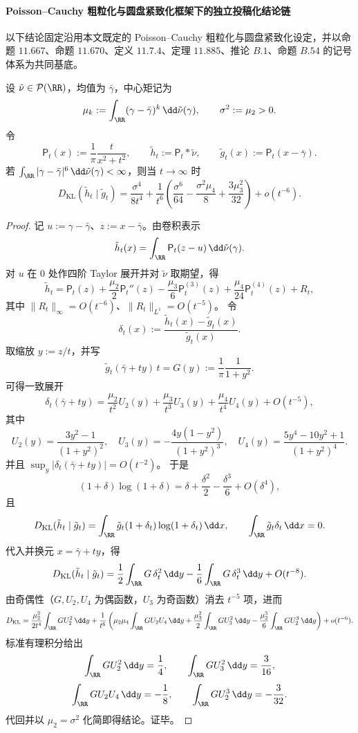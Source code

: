 \paragraph{Poisson--Cauchy 粗粒化与圆盘紧致化框架下的独立投稿化结论链}
以下结论固定沿用本文既定的 Poisson--Cauchy 粗粒化与圆盘紧致化设定，并以命题 \(11.667\)、命题 \(11.670\)、定义 \(11.7.4\)、定理 \(11.885\)、推论 \(B.1\)、命题 \(B.54\) 的记号体系为共同基底。

\begin{conclusion}\label{con:xi-poisson-cauchy-kl-sixth-order-independent-submission}
设 \(\tilde\nu\in\mathcal P(\RR)\)，均值为 \(\bar\gamma\)，中心矩记为
\[
\mu_k:=\int_{\RR}(\gamma-\bar\gamma)^k\,\dd\tilde\nu(\gamma),\qquad
\sigma^2:=\mu_2>0.
\]
令
\[
\mathsf P_t(x):=\frac{1}{\pi}\frac{t}{x^2+t^2},\qquad
\tilde h_t:=\mathsf P_t*\tilde\nu,\qquad
\tilde g_t(x):=\mathsf P_t(x-\bar\gamma).
\]
若 \(\int_{\RR}|\gamma-\bar\gamma|^6\,\dd\tilde\nu(\gamma)<\infty\)，则当 \(t\to\infty\) 时
\[
D_{\mathrm{KL}}(\tilde h_t\mid \tilde g_t)
=\frac{\sigma^4}{8t^4}
+\frac{1}{t^6}\left(
\frac{\sigma^6}{64}
-\frac{\sigma^2\mu_4}{8}
+\frac{3\mu_3^2}{32}
\right)
+o(t^{-6}).
\]
\end{conclusion}
\begin{proof}
记 \(u:=\gamma-\bar\gamma\)、\(z:=x-\bar\gamma\)。由卷积表示
\[
\tilde h_t(x)=\int_{\RR}\mathsf P_t(z-u)\,\dd\tilde\nu(\gamma).
\]
对 \(u\) 在 \(0\) 处作四阶 Taylor 展开并对 \(\tilde\nu\) 取期望，得
\[
\tilde h_t
=\mathsf P_t(z)
+\frac{\mu_2}{2}\mathsf P_t''(z)
-\frac{\mu_3}{6}\mathsf P_t^{(3)}(z)
+\frac{\mu_4}{24}\mathsf P_t^{(4)}(z)
+R_t,
\]
其中 \(\|R_t\|_\infty=O(t^{-6})\)、\(\|R_t\|_{L^1}=O(t^{-5})\)。
令
\[
\delta_t(x):=\frac{\tilde h_t(x)-\tilde g_t(x)}{\tilde g_t(x)}.
\]
取缩放 \(y:=z/t\)，并写
\[
\tilde g_t(\bar\gamma+ty)\,t=G(y):=\frac{1}{\pi}\frac{1}{1+y^2}.
\]
可得一致展开
\[
\delta_t(\bar\gamma+ty)
=\frac{\mu_2}{t^2}U_2(y)+\frac{\mu_3}{t^3}U_3(y)+\frac{\mu_4}{t^4}U_4(y)+O(t^{-5}),
\]
其中
\[
U_2(y)=\frac{3y^2-1}{(1+y^2)^2},\quad
U_3(y)=-\frac{4y(1-y^2)}{(1+y^2)^3},\quad
U_4(y)=\frac{5y^4-10y^2+1}{(1+y^2)^4}.
\]
并且 \(\sup_y|\delta_t(\bar\gamma+ty)|=O(t^{-2})\)。
于是
\[
(1+\delta)\log(1+\delta)=\delta+\frac{\delta^2}{2}-\frac{\delta^3}{6}+O(\delta^4),
\]
且
\[
D_{\mathrm{KL}}(\tilde h_t\mid \tilde g_t)
=\int_{\RR}\tilde g_t(1+\delta_t)\log(1+\delta_t)\,\dd x,\qquad
\int_{\RR}\tilde g_t\delta_t\,\dd x=0.
\]
代入并换元 \(x=\bar\gamma+ty\)，得
\[
D_{\mathrm{KL}}(\tilde h_t\mid \tilde g_t)
=\frac12\int_{\RR}G\,\delta_t^2\,\dd y
-\frac16\int_{\RR}G\,\delta_t^3\,\dd y
+O(t^{-8}).
\]
由奇偶性（\(G,U_2,U_4\) 为偶函数，\(U_3\) 为奇函数）消去 \(t^{-5}\) 项，进而
\[
D_{\mathrm{KL}}
=\frac{\mu_2^2}{2t^4}\int_{\RR}GU_2^2\,\dd y
+\frac{1}{t^6}\left(
\mu_2\mu_4\int_{\RR}GU_2U_4\,\dd y
+\frac{\mu_3^2}{2}\int_{\RR}GU_3^2\,\dd y
-\frac{\mu_2^3}{6}\int_{\RR}GU_2^3\,\dd y
\right)
+o(t^{-6}).
\]
标准有理积分给出
\[
\int_{\RR}GU_2^2\,\dd y=\frac14,\qquad
\int_{\RR}GU_3^2\,\dd y=\frac{3}{16},
\]
\[
\int_{\RR}GU_2U_4\,\dd y=-\frac18,\qquad
\int_{\RR}GU_2^3\,\dd y=-\frac{3}{32}.
\]
代回并以 \(\mu_2=\sigma^2\) 化简即得结论。证毕。
\end{proof}

